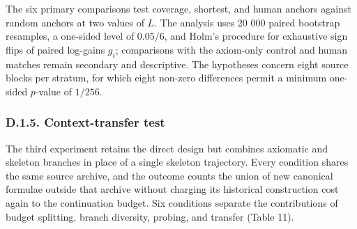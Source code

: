\documentclass[pdflatex,sn-basic,Numbered]{sn-jnl}
\begin{document}
The six primary comparisons test coverage, shortest, and human anchors against random anchors at two values of \(L\). The analysis uses 20 000 paired bootstrap resamples, a one-sided level of \(0.05/6\), and Holm's procedure for exhaustive sign flips of paired log-gains \(g_{i}\); comparisons with the axiom-only control and human matches remain secondary and descriptive. The hypotheses concern eight source blocks per stratum, for which eight non-zero differences permit a minimum one-sided \(p\)-value of \(1/256.\)

\subsubsection*{D.1.5. Context-transfer test}\label{d.1.5.-context-transfer-test}

The third experiment retains the direct design but combines axiomatic and skeleton branches in place of a single skeleton trajectory. Every condition shares the same source archive, and the outcome counts the union of new canonical formulae outside that archive without charging its historical construction cost again to the continuation budget. Six conditions separate the contributions of budget splitting, branch diversity, probing, and transfer (Table 11).

\begingroup
\small
\setlength{\tabcolsep}{3pt}
\renewcommand{\arraystretch}{1.13}
\end{document}
